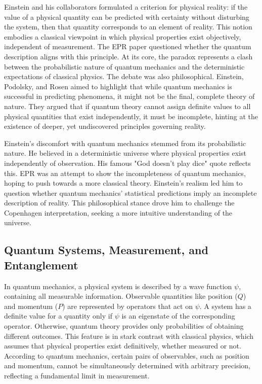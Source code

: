 \documentclass[17pt,a4paper]{extarticle}
\begin{document}
Einstein and his collaborators formulated a criterion for physical reality: if the value of a physical quantity can be predicted with certainty without disturbing the system, then that quantity corresponds to an element of reality. This notion embodies a classical viewpoint in which physical properties exist objectively, independent of measurement. The EPR paper questioned whether the quantum description aligns with this principle. At its core, the paradox represents a clash between the probabilistic nature of quantum mechanics and the deterministic expectations of classical physics. The debate was also philosophical. Einstein, Podolsky, and Rosen aimed to highlight that while quantum mechanics is successful in predicting phenomena, it might not be the final, complete theory of nature. They argued that if quantum theory cannot assign definite values to all physical quantities that exist independently, it must be incomplete, hinting at the existence of deeper, yet undiscovered principles governing reality.

Einstein's discomfort with quantum mechanics stemmed from its probabilistic nature. He believed in a deterministic universe where physical properties exist independently of observation. His famous "God doesn't play dice" quote reflects this. EPR was an attempt to show the incompleteness of quantum mechanics, hoping to push towards a more classical theory. Einstein's realism led him to question whether quantum mechanics' statistical predictions imply an incomplete description of reality. This philosophical stance drove him to challenge the Copenhagen interpretation, seeking a more intuitive understanding of the universe.
\subsection{Quantum Systems, Measurement, and Entanglement}
In quantum mechanics, a physical system is described by a wave function $\psi$, containing all measurable information. Observable quantities like position ($Q$) and momentum ($P$) are represented by operators that act on $\psi$. A system has a definite value for a quantity only if $\psi$ is an eigenstate of the corresponding operator. Otherwise, quantum theory provides only probabilities of obtaining different outcomes. This feature is in stark contrast with classical physics, which assumes that physical properties exist definitively, whether measured or not. According to quantum mechanics, certain pairs of observables, such as position and momentum, cannot be simultaneously determined with arbitrary precision, reflecting a fundamental limit in measurement.
\end{document}
